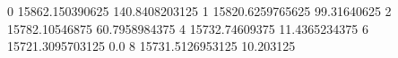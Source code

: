 0 15862.150390625 140.8408203125
1 15820.6259765625 99.31640625
2 15782.10546875 60.7958984375
4 15732.74609375 11.4365234375
6 15721.3095703125 0.0
8 15731.5126953125 10.203125

